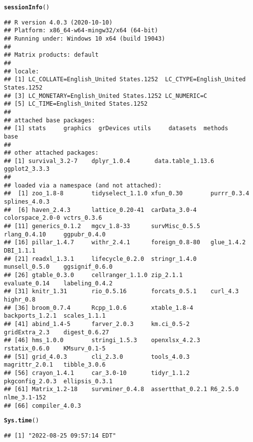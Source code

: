 \documentclass{article}\usepackage[]{graphicx}\usepackage[]{color}
\makeatletter
\newcommand{\hlstd}[1]{\textcolor[rgb]{0.345,0.345,0.345}{#1}}%
\newcommand{\hlkwd}[1]{\textcolor[rgb]{0.737,0.353,0.396}{\textbf{#1}}}%
\newenvironment{kframe}{%
 \def\at@end@of@kframe{}%
 \ifinner\ifhmode%
  \def\at@end@of@kframe{\end{minipage}}%
  \begin{minipage}{\columnwidth}%
 \fi\fi%
 \def\FrameCommand##1{\hskip\@totalleftmargin \hskip-\fboxsep
 \colorbox{shadecolor}{##1}\hskip-\fboxsep
     \hskip-\linewidth \hskip-\@totalleftmargin \hskip\columnwidth}%
 \MakeFramed {\advance\hsize-\width
   \@totalleftmargin\z@ \linewidth\hsize
   \@setminipage}}%
 {\par\unskip\endMakeFramed%
 \at@end@of@kframe}
\newenvironment{knitrout}{}{} %
\makeatother
\begin{document}
\begin{knitrout}
\color{fgcolor}\begin{kframe}
\begin{alltt}
\hlkwd{sessionInfo}\hlstd{()}
\end{alltt}
\begin{verbatim}
## R version 4.0.3 (2020-10-10)
## Platform: x86_64-w64-mingw32/x64 (64-bit)
## Running under: Windows 10 x64 (build 19043)
## 
## Matrix products: default
## 
## locale:
## [1] LC_COLLATE=English_United States.1252  LC_CTYPE=English_United States.1252   
## [3] LC_MONETARY=English_United States.1252 LC_NUMERIC=C                          
## [5] LC_TIME=English_United States.1252    
## 
## attached base packages:
## [1] stats     graphics  grDevices utils     datasets  methods   base     
## 
## other attached packages:
## [1] survival_3.2-7    dplyr_1.0.4       data.table_1.13.6 ggplot2_3.3.3    
## 
## loaded via a namespace (and not attached):
##  [1] zoo_1.8-8        tidyselect_1.1.0 xfun_0.30        purrr_0.3.4      splines_4.0.3   
##  [6] haven_2.4.3      lattice_0.20-41  carData_3.0-4    colorspace_2.0-0 vctrs_0.3.6     
## [11] generics_0.1.2   mgcv_1.8-33      survMisc_0.5.5   rlang_0.4.10     ggpubr_0.4.0    
## [16] pillar_1.4.7     withr_2.4.1      foreign_0.8-80   glue_1.4.2       DBI_1.1.1       
## [21] readxl_1.3.1     lifecycle_0.2.0  stringr_1.4.0    munsell_0.5.0    ggsignif_0.6.0  
## [26] gtable_0.3.0     cellranger_1.1.0 zip_2.1.1        evaluate_0.14    labeling_0.4.2  
## [31] knitr_1.31       rio_0.5.16       forcats_0.5.1    curl_4.3         highr_0.8       
## [36] broom_0.7.4      Rcpp_1.0.6       xtable_1.8-4     backports_1.2.1  scales_1.1.1    
## [41] abind_1.4-5      farver_2.0.3     km.ci_0.5-2      gridExtra_2.3    digest_0.6.27   
## [46] hms_1.0.0        stringi_1.5.3    openxlsx_4.2.3   rstatix_0.6.0    KMsurv_0.1-5    
## [51] grid_4.0.3       cli_2.3.0        tools_4.0.3      magrittr_2.0.1   tibble_3.0.6    
## [56] crayon_1.4.1     car_3.0-10       tidyr_1.1.2      pkgconfig_2.0.3  ellipsis_0.3.1  
## [61] Matrix_1.2-18    survminer_0.4.8  assertthat_0.2.1 R6_2.5.0         nlme_3.1-152    
## [66] compiler_4.0.3
\end{verbatim}
\begin{alltt}
\hlkwd{Sys.time}\hlstd{()}
\end{alltt}
\begin{verbatim}
## [1] "2022-08-25 09:57:14 EDT"
\end{verbatim}
\end{kframe}
\end{knitrout}
\end{document}
